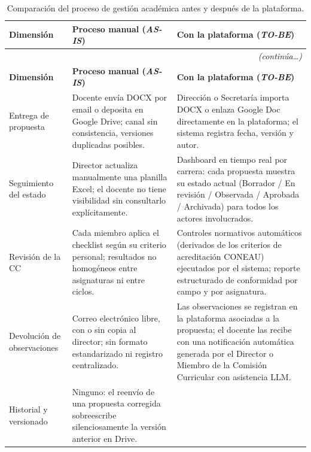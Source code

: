 \setlength{\extrarowheight}{4pt}
\begin{longtable}{p{3cm} p{5cm} p{7cm}}
\caption{Comparación del proceso de gestión académica antes y después de la plataforma.}
\label{tab:asis_tobe} \\
\toprule
\textbf{Dimensión} & \textbf{Proceso manual (\textit{AS-IS})} & \textbf{Con la plataforma (\textit{TO-BE})} \\
\midrule
\endfirsthead
\multicolumn{3}{r}{\small\textit{(continúa\ldots)}} \\[2pt]
\toprule
\textbf{Dimensión} & \textbf{Proceso manual (\textit{AS-IS})} & \textbf{Con la plataforma (\textit{TO-BE})} \\
\midrule
\endhead
\bottomrule
\endfoot
Entrega de propuesta
  & Docente envía DOCX por email o deposita en Google Drive;
    canal sin consistencia, versiones duplicadas posibles.
  & Dirección o Secretaría importa DOCX o enlaza Google Doc directamente
    en la plataforma; el sistema registra fecha, versión y autor. \\
\arrayrulecolor{gray!35}\hline\arrayrulecolor{black}
Seguimiento del estado
  & Director actualiza manualmente una planilla Excel;
    el docente no tiene visibilidad sin consultarlo explícitamente.
  & Dashboard en tiempo real por carrera: cada propuesta
    muestra su estado actual (Borrador / En revisión / Observada /
    Aprobada / Archivada) para todos los actores involucrados. \\
\arrayrulecolor{gray!35}\hline\arrayrulecolor{black}
Revisión de la CC
  & Cada miembro aplica el checklist según su criterio personal;
    resultados no homogéneos entre asignaturas ni entre ciclos.
  & Controles normativos autom\'{a}ticos (derivados de los criterios
    de acreditaci\'{o}n CONEAU) ejecutados por el sistema; reporte
    estructurado de conformidad por campo y por asignatura. \\
\arrayrulecolor{gray!35}\hline\arrayrulecolor{black}
Devolución de observaciones
  & Correo electrónico libre, con o sin copia al director;
    sin formato estandarizado ni registro centralizado.
  & Las observaciones se registran en la plataforma asociadas
    a la propuesta; el docente las recibe con una notificación
    automática generada por el Director o Miembro de la Comisión Curricular con asistencia LLM. \\
\arrayrulecolor{gray!35}\hline\arrayrulecolor{black}
Historial y versionado
  & Ninguno: el reenvío de una propuesta corregida sobreescribe
    silenciosamente la versión anterior en Drive.

\end{longtable}
